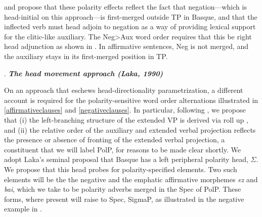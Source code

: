 \documentclass[output=paper]{langscibook}
\begin{document}
\cite{laka1990} and \cite{elordieta2001, elordieta2008} propose that these polarity effects reflect the fact that negation---which is head-initial on this approach---is first-merged outside TP in Basque, and that the inflected verb must head adjoin to negation as a way of providing lexical support for the clitic-like auxiliary. The Neg>Aux word order requires that this be right head adjunction as shown in \Next.  In affirmative sentences, Neg is not merged, and the auxiliary stays in its first-merged position in TP.  

\ex. \textbf{\textit{The head movement approach (Laka, 1990)}} \label{tree-2} \\  \samepage
\vspace{.5cm}




On an approach that eschews head-directionality parametrization, a different account is required for the polarity-sensitive word order alternations illustrated in \ref{affirmativeclauses} and \protect\ref{negativeclauses}.  In particular, following \cite{haddican2004a, haddican2008}, we propose that  (i) the left-branching structure of the extended VP is derived via roll up \citep{kayne1994}, and (ii) the relative order of the auxiliary and extended verbal projection reflects the presence or absence of fronting of the extended verbal projection, a constituent that we will label PolP, for reasons to be made clear shortly.  We adopt Laka's seminal proposal that Basque has a left peripheral polarity head, $\Sigma$.  We propose that this head probes for polarity-specified elements.  Two such elements will be the the negative and the emphatic affirmative morphemes \textit{ez} and \textit{bai}, which we take to be  polarity adverbs merged in the Spec of  PolP. These forms, where present will raise to Spec, SigmaP, as illustrated in the negative example in \Next.
	
\end{document}
